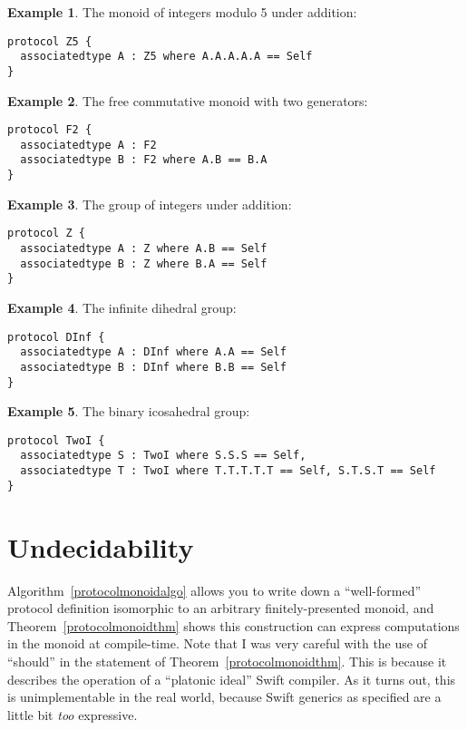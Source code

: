 \documentclass[a4paper,headsepline,bibliography=totoc,toc=flat,fleqn,twoside=semi]{scrbook}
\theoremstyle{definition}
\theoremstyle{definition}
\newtheorem{example}{Example}[chapter]
\theoremstyle{definition}
\begin{document}
\begin{example}
The monoid of integers modulo 5 under addition:
\begin{Verbatim}
protocol Z5 {
  associatedtype A : Z5 where A.A.A.A.A == Self
}
\end{Verbatim}
\end{example}

\begin{example}
The free commutative monoid with two generators:
\begin{Verbatim}
protocol F2 {
  associatedtype A : F2
  associatedtype B : F2 where A.B == B.A
}
\end{Verbatim}
\end{example}

\begin{example}
The group of integers under addition:
\begin{Verbatim}
protocol Z {
  associatedtype A : Z where A.B == Self
  associatedtype B : Z where B.A == Self
}
\end{Verbatim}
\end{example}

\begin{example}
The infinite dihedral group:
\begin{Verbatim}
protocol DInf {
  associatedtype A : DInf where A.A == Self
  associatedtype B : DInf where B.B == Self
}
\end{Verbatim}
\end{example}
\begin{example}
The binary icosahedral group:
\begin{Verbatim}
protocol TwoI {
  associatedtype S : TwoI where S.S.S == Self,
  associatedtype T : TwoI where T.T.T.T.T == Self, S.T.S.T == Self
}
\end{Verbatim}
\end{example}
\section{Undecidability}
Algorithm~\ref{protocolmonoidalgo} allows you to write down a ``well-formed'' protocol definition isomorphic to an arbitrary finitely-presented monoid, and Theorem~\ref{protocolmonoidthm} shows this construction can express computations in the monoid at compile-time. Note that I was very careful with the use of ``should'' in the statement of Theorem~\ref{protocolmonoidthm}. This is because it describes the operation of a ``platonic ideal'' Swift compiler. As it turns out, this is unimplementable in the real world, because Swift generics as specified are a little bit \emph{too} expressive.
\end{document}
